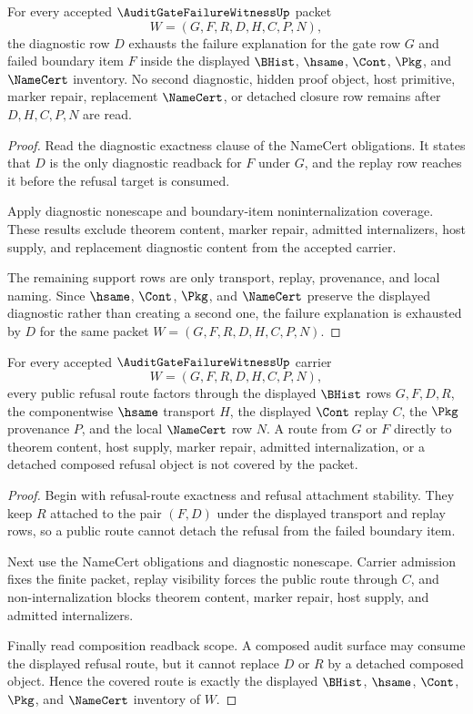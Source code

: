 \begin{theorem}
\label{thm:audit-gate-failure-witness-failure-diagnostic-exhaustion}
For every accepted $\AuditGateFailureWitnessUp$ packet
$$
W=(G,F,R,D,H,C,P,N),
$$
the diagnostic row $D$ exhausts the failure explanation for the gate row $G$ and failed boundary item $F$ inside the displayed $\BHist$, $\hsame$, $\Cont$, $\Pkg$, and $\NameCert$ inventory. No second diagnostic, hidden proof object, host primitive, marker repair, replacement $\NameCert$, or detached closure row remains after $D,H,C,P,N$ are read.
\end{theorem}
\begin{proof}
Read the diagnostic exactness clause of the NameCert obligations. It states that $D$ is the only diagnostic readback for $F$ under $G$, and the replay row reaches it before the refusal target is consumed.

Apply diagnostic nonescape and boundary-item noninternalization coverage. These results exclude theorem content, marker repair, admitted internalizers, host supply, and replacement diagnostic content from the accepted carrier.

The remaining support rows are only transport, replay, provenance, and local naming. Since $\hsame$, $\Cont$, $\Pkg$, and $\NameCert$ preserve the displayed diagnostic rather than creating a second one, the failure explanation is exhausted by $D$ for the same packet $W=(G,F,R,D,H,C,P,N)$.
\end{proof}

\begin{theorem}
\label{thm:audit-gate-failure-witness-refusal-route-coverage}
For every accepted $\AuditGateFailureWitnessUp$ carrier
$$
W=(G,F,R,D,H,C,P,N),
$$
every public refusal route factors through the displayed $\BHist$ rows $G,F,D,R$, the componentwise $\hsame$ transport $H$, the displayed $\Cont$ replay $C$, the $\Pkg$ provenance $P$, and the local $\NameCert$ row $N$. A route from $G$ or $F$ directly to theorem content, host supply, marker repair, admitted internalization, or a detached composed refusal object is not covered by the packet.
\end{theorem}
\begin{proof}
Begin with refusal-route exactness and refusal attachment stability. They keep $R$ attached to the pair $(F,D)$ under the displayed transport and replay rows, so a public route cannot detach the refusal from the failed boundary item.

Next use the NameCert obligations and diagnostic nonescape. Carrier admission fixes the finite packet, replay visibility forces the public route through $C$, and non-internalization blocks theorem content, marker repair, host supply, and admitted internalizers.

Finally read composition readback scope. A composed audit surface may consume the displayed refusal route, but it cannot replace $D$ or $R$ by a detached composed object. Hence the covered route is exactly the displayed $\BHist$, $\hsame$, $\Cont$, $\Pkg$, and $\NameCert$ inventory of $W$.
\end{proof}

